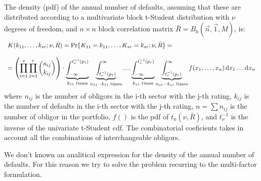 \documentclass[11pt,fleqn]{book} %
\begin{document}
\begin{proposition}
	The density (pdf) of the annual number of defaults, assuming that these
	are distributed according to a multivariate block t-Student distribution
	with $\nu$ degrees of freedom, and $n {\times} n$ block correlation matrix 
	$\bar{R} = B_k(\vec{n},\vec{1},M)$, is:
	\begin{displaymath}
		\begin{array}{l}
			K(k_{11},\dots,k_{sr}; \nu, \bar{R}) = 
			\Pr\{K_{11}=k_{11},\dots,K_{sr}=k_{sr}; \nu, \bar{R}\} = \\
			\\
			= \left( \displaystyle \prod_{i=1}^s \prod_{j=1}^r \binom{n_{ij}}{k_{ij}} \right) \cdot       
			\displaystyle                                                                                 
			\underbrace{\int_{-\infty}^{t_{\nu}^{-1}(p_1)}}_{k_{11} \text{ times}}                        
			\underbrace{\int_{t_{\nu}^{-1}(p_1)}^{\infty}}_{n_{11}-k_{11} \text{ times}}                  
			\dots                                                                                         
			\underbrace{\int_{-\infty}^{t_{\nu}^{-1}(p_r)}}_{k_{sr} \text{ times}}                        
			\underbrace{\int_{t_{\nu}^{-1}(p_r)}^{\infty}}_{n_{sr}-k_{sr} \text{ times}}                  
			f(x_1,\dots,x_n) \mathop{\mathrm{{}d}}\mathopen{} x_1 \dots \mathop{\mathrm{{}d}}\mathopen{} x_n                                                        
		\end{array}
	\end{displaymath}
	where $n_{ij}$ is the number of obligors in the i-th sector with the 
	j-th rating, $k_{ij}$ is the number of defaults in the i-th sector 
	with the j-th rating, $n = \sum n_{ij}$ is the number of obligor in the
	portfolio, $f()$ is the pdf of $t_n(\nu,\bar{R})$, and $t_{\nu}^{-1}$ is 
	the inverse of the univariate t-Student cdf. The combinatorial coeficients
	takes in account all the combinations of interchangeable obligors.
\end{proposition}

We don't known an analitical expression for the density of the annual 
number of defaults. For this reason we try to solve the problem recurring 
to the multi-factor formulation.
\end{document}
